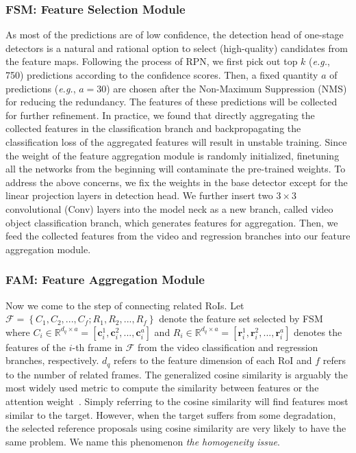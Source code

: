 \documentclass[letterpaper]{article} \usepackage{aaai23}  \usepackage{times}  \usepackage{helvet}  \usepackage{courier}  \usepackage[hyphens]{url}  \usepackage{graphicx} \urlstyle{rm} \def\UrlFont{\rm}  \usepackage{natbib}  \usepackage{caption} \usepackage{xcolor}
\begin{document}
\subsubsection{FSM: Feature Selection Module}
As most of the predictions are of low confidence, the detection head of one-stage detectors is a natural and rational option to select (high-quality) candidates from the feature maps. Following the process of RPN, we first pick out top $k$ (\emph{e.g.}, 750) predictions according to the confidence scores. Then, a fixed quantity $a$ of predictions (\emph{e.g.}, $a=30$) are chosen after the Non-Maximum Suppression (NMS) for reducing the redundancy. The features of these predictions will be collected for further refinement. 
In practice, we found that directly aggregating the collected features in the classification branch and backpropagating the classification loss of the aggregated features will result in unstable training. Since the weight of the feature aggregation module is randomly initialized, finetuning all the networks from the beginning will contaminate the pre-trained weights. To address the above concerns, we fix the weights in the base detector except for the linear projection layers in detection head. We further insert two $3 \times 3$ convolutional (Conv) layers into the model neck as a new branch, called video object classification branch, which generates features for aggregation. Then, we feed the collected features from the video and regression branches into our feature aggregation module. 

\subsubsection{FAM: Feature Aggregation Module}

Now we come to the step of connecting related RoIs.
Let $\mathcal{F} = \left\{{C}_{1}, {C}_{2}, ..., {C}_{f};{R}_{1}, {R}_{2}, ..., {R}_{f}\right\}$ denote the feature set selected by FSM where $C_i\in\mathbb{R}^{d_q\times a} = \left[\mathbf{c}_{i}^{1}, \mathbf{c}_{i}^{2}, ..., \mathbf{c}_{i}^{a}\right]$ and $R_i\in\mathbb{R}^{d_q\times a} = \left[\mathbf{r}_{i}^{1}, \mathbf{r}_{i}^{2}, ..., \mathbf{r}_{i}^{a}\right]$ denotes the features of the $i$-th frame in $\mathcal{F}$ from the video classification and regression branches, respectively. $d_q$ refers to the feature dimension of each RoI and $f$ refers to the number of related frames. The generalized cosine similarity is arguably the most widely used metric to compute the similarity between features or the attention weight~\cite{wu2019sequence,shvets2019leveraging,deng2019relation}. Simply referring to the cosine similarity will find features most similar to the target. However, when the target suffers from some degradation, the selected reference proposals using cosine similarity are very likely to have the same problem. We name this phenomenon \emph{the homogeneity issue}. 
\end{document}
